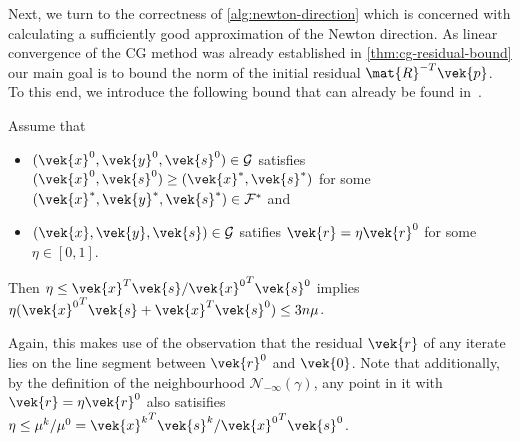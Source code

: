 Next, we turn to the correctness of \cref{alg:newton-direction} which is concerned with calculating a sufficiently good approximation of the Newton direction.
As linear convergence of the CG method was already established in \cref{thm:cg-residual-bound} our main goal is to bound the norm of the initial residual \(\mat{R}^{-T}\vek{p}\).
To this end, we introduce the following bound that can already be found in~\cite{Monteiro-ConvergenceAnalysisLongStepInfeasibleIPMs}.

\begin{lemma}\label{thm:eta-bound}
  Assume that
  \begin{itemize}
    \item \((\vek{x}^0, \vek{y}^0, \vek{s}^0) \in \mathcal{G}\) satisfies \((\vek{x}^0, \vek{s}^0) \geq (\vek{x}^*, \vek{s}^*)\) for some \((\vek{x}^*, \vek{y}^*, \vek{s}^*) \in \mathcal{F}^*\) and
    \item \((\vek{x}, \vek{y}, \vek{s}) \in \mathcal{G}\) satifies \(\vek{r} = \eta \vek{r}^0\) for some \(\eta \in [0, 1]\).
  \end{itemize}
  Then \(\eta \leq \vek{x}^T \vek{s} / {\vek{x}^0}^T \vek{s}^0\) implies \(\eta ({\vek{x}^0}^T \vek{s} + \vek{x}^T {\vek{s}^0}) \leq 3 n \mu\).
\end{lemma}

Again, this makes use of the observation that the residual \(\vek{r}\) of any iterate lies on the line segment between \(\vek{r}^0\) and \(\vek{0}\).
Note that additionally, by the definition of the neighbourhood \(\mathcal{N}_{-\infty}(\gamma)\), any point in it with \(\vek{r} = \eta \vek{r}^0\) also satisifies \(\eta \leq \mu^k / \mu^0 = {\vek{x}^k}^T \vek{s}^k / {\vek{x}^0}^T \vek{s}^0\).

